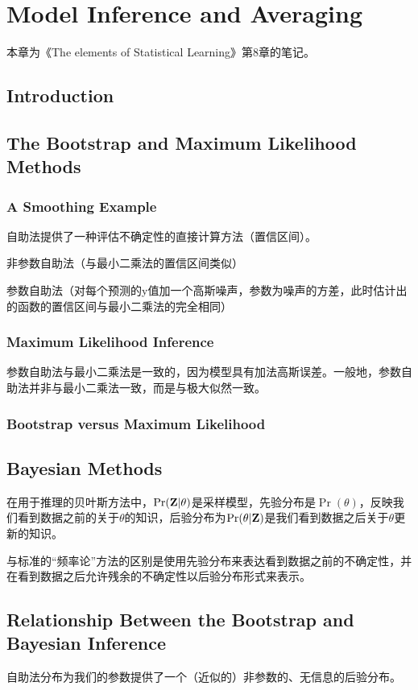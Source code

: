 \chapter{Model Inference and Averaging}
    本章为《The elements of Statistical Learning》第8章的笔记。
    \section{Introduction}
    \section{The Bootstrap and Maximum Likelihood Methods}
        \subsection{A Smoothing Example}
            自助法提供了一种评估不确定性的直接计算方法（置信区间）。
            \begindot
                \item 非参数自助法（与最小二乘法的置信区间类似）
                \item 参数自助法（对每个预测的y值加一个高斯噪声，参数为噪声的方差，此时估计出的函数的置信区间与最小二乘法的完全相同）
            \myenddot
        \subsection{Maximum Likelihood Inference}
            参数自助法与最小二乘法是一致的，因为模型具有加法高斯误差。一般地，参数自助法并非与最小二乘法一致，而是与极大似然一致。
        \subsection{Bootstrap versus Maximum Likelihood}
    \section{Bayesian Methods}
        在用于推理的贝叶斯方法中，$\Pr ({\bf{Z}}|\theta )$是采样模型，先验分布是$\Pr (\theta )$，反映我们看到数据之前的关于$\theta$的知识，后验分布为$\Pr (\theta |{\bf{Z}})$是我们看到数据之后关于$\theta$更新的知识。

        与标准的“频率论”方法的区别是使用先验分布来表达看到数据之前的不确定性，并在看到数据之后允许残余的不确定性以后验分布形式来表示。
    \section{Relationship Between the Bootstrap and Bayesian Inference}
        自助法分布为我们的参数提供了一个（近似的）非参数的、无信息的后验分布。
